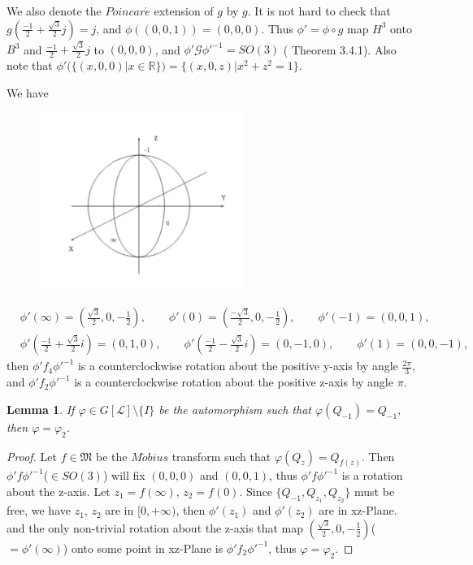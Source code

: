 \documentclass{amsart}
\newcommand{\G}{\mathcal G}
\newcommand{\LLL}{\mathcal L} %
\newcommand{\MMM}{\mathfrak M}
\newcommand{\R}{\mathbb R}  %
\newtheorem{lemma}{Lemma}[section]
\begin{document}
We also denote the $Poincar\acute{e}$ extension of $g$ by $g$. It is not hard to check that $g(\frac{-1}{2} + \frac{\sqrt{3}}{2}j) = j$,
and $\phi((0,0,1)) = (0,0,0)$. Thus $\phi' = \phi\circ g$ map $H^3$ onto $B^3$ and $\frac{-1}{2} + \frac{\sqrt{3}}{2}j$ to $(0, 0, 0)$,
and $\phi' \G \phi'^{-1} = SO(3)$ (\cite{BA} Theorem 3.4.1). Also note that $\phi'(\{(x,0,0) | x \in \R\}) = \{(x,0,z)| x^2 + z^2 = 1 \}$.

We have
\begin{figure}[H]
\begin{center}
\includegraphics [width=0.6\textwidth]{spherepic.pdf}
\caption{}
\end{center}
\end{figure}

\begin{align*}
&\phi'(\infty) = (\frac{\sqrt{3}}{2}, 0, -\frac{1}{2}), \qquad \phi'(0) = (\frac{-\sqrt{3}}{2}, 0, -\frac{1}{2}), \qquad \phi'(-1) = (0,0,1), \\
&\phi'(\frac{-1}{2} + \frac{\sqrt{3}}{2}i) = (0,1,0), \qquad \phi'(\frac{-1}{2} -\frac{\sqrt{3}}{2}i) = (0,-1,0), \qquad \phi'(1) = (0,0,-1),
\end{align*}
then $\phi' f_4 \phi'^{-1}$ is a counterclockwise rotation about the positive y-axis by angle $\frac{2\pi}{3}$,
and $\phi' f_2 \phi'^{-1}$ is a counterclockwise rotation about the positive z-axis by angle $\pi$.

\begin{lemma}
If $\varphi \in G[\LLL] \setminus \{I \}$ be the automorphism such that $\varphi(Q_{-1}) = Q_{-1}$, then $\varphi = \varphi_2$.
\end{lemma}

\begin{proof}
Let $f \in \MMM$ be the $M\ddot{o}bius$ transform such that $\varphi(Q_z) = Q_{f(z)}$. Then $\phi' f \phi'^{-1}$($\in SO(3)$) will
fix $(0,0,0)$ and $(0,0,1)$, thus $\phi' f \phi'^{-1}$ is a rotation about the z-axis. Let $z_1 = f(\infty)$, $z_2 = f(0)$. Since
$\{Q_{-1}, Q_{z_1}, Q_{z_2} \}$ must be free, we have $z_1$, $z_2$ are in $[0, +\infty)$, then $\phi'(z_1)$ and $\phi'(z_2)$ are
in xz-Plane. and the only non-trivial rotation about the z-axis that map $(\frac{\sqrt{3}}{2}, 0, -\frac{1}{2})$($= \phi'(\infty)$) onto some
point in xz-Plane is $\phi' f_2 \phi'^{-1}$, thus $\varphi = \varphi_2$.
\end{proof}
\end{document}

